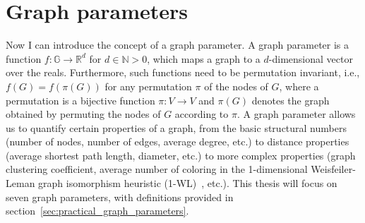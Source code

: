 \section{Graph parameters} \label{sec:theoretical_graph_parameters}
Now I can introduce the concept of a graph parameter. A graph parameter is a function $f: \mathbb{G} \rightarrow \mathbb{R}^d$ for $d\in \mathbb{N} >0$, which maps a graph to a $d$-dimensional vector over the reals. Furthermore, such functions need to be permutation invariant, i.e., $f(G) = f(\pi(G))$ for any permutation $\pi$ of the nodes of $G$, where a permutation is a bijective function $\pi: V \rightarrow V$ and $\pi(G)$ denotes the graph obtained by permuting the nodes of $G$ according to $\pi$. A graph parameter allows us to quantify certain properties of a graph, from the basic structural numbers (number of nodes, number of edges, average degree, etc.) to distance properties (average shortest path length, diameter, etc.) to more complex properties (graph clustering coefficient, average number of coloring in the 1-dimensional Weisfeiler-Leman graph isomorphism heuristic (1-WL)~\cite{weisfeiler1968reduction}, etc.). This thesis will focus on seven graph parameters, with definitions provided in section~\ref{sec:practical_graph_parameters}.